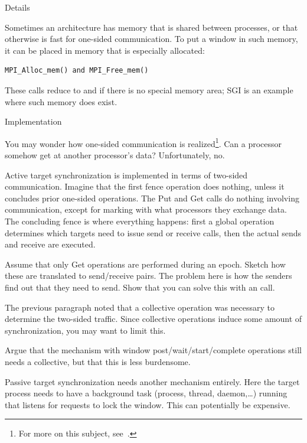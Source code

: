  {Details}
\label{sec:mpi-alloc}

Sometimes an architecture has memory that is shared between processes,
or that otherwise is fast for one-sided communication. To put a window
in such memory, it can be placed in memory that is especially
allocated:
\begin{verbatim}
MPI_Alloc_mem() and MPI_Free_mem()
\end{verbatim}
These calls reduce to  and  if there is no special
memory area; SGI is an example where such memory does exist.

 {Implementation}

You may wonder how one-sided communication is realized\footnote{For
  more on this subject, see~\cite{thakur:ijhpca-sync}.}. Can a processor
somehow get at another processor's data? Unfortunately, no.

Active target synchronization is implemented in terms of two-sided communication.
Imagine that the first fence operation does nothing, unless it concludes prior
one-sided operations. The Put and Get calls do nothing involving communication,
except for marking with what processors they exchange data.
The concluding fence is where everything happens: first a global operation
determines which targets need to issue send or receive calls, then the
actual sends and receive are executed.

\begin{exercise}
  Assume that only Get operations are performed during an epoch. 
  Sketch how these are translated to send/receive pairs. 
  The problem here is how the senders find out that they need to send.
  Show that you can solve this with an  call.
\end{exercise}

The previous paragraph noted that a collective operation was necessary
to determine the two-sided traffic. Since collective operations induce
some amount of synchronization, you may want to limit this.

\begin{exercise}
  Argue that the mechanism with window post/wait/start/complete operations
  still needs a collective, but that this is less burdensome.
\end{exercise}

Passive target synchronization needs another mechanism entirely.  Here
the target process needs to have a background task (process, thread,
daemon,\ldots) running that listens for requests to lock the
window. This can potentially be expensive.

